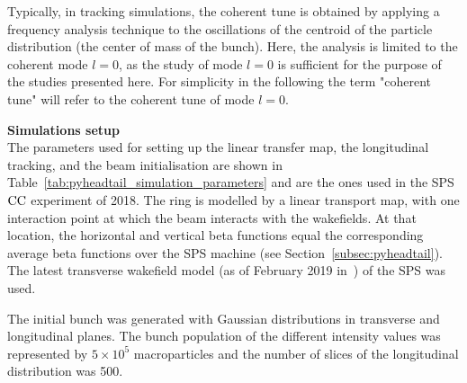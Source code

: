 Typically, in tracking simulations, the coherent tune is obtained by applying a frequency analysis technique to the oscillations of the centroid of the particle distribution (the center of mass of the bunch). Here, the analysis is limited to the coherent mode $l=0$, %
as the study of mode $l=0$ is sufficient for the purpose of the studies presented here. For simplicity in the following the term "coherent tune" will refer to the coherent tune of mode $l=0$.

\textbf{Simulations setup}\\
The parameters used for setting up the linear transfer map, the longitudinal tracking, and the beam initialisation are shown in Table~\ref{tab:pyheadtail_simulation_parameters} and are the ones used in the SPS ${\mathrm{CC}}$ experiment of 2018. The ring is modelled by a linear transport map, with one interaction point at which the beam interacts with the wakefields. At that location, the horizontal and vertical beta functions equal the corresponding average beta functions over the SPS machine (see Section~\ref{subsec:pyheadtail}). The latest transverse wakefield model (as of February 2019 in~\cite{sps_impedance_model_git}) of the SPS was used.

The initial bunch was generated with Gaussian distributions in transverse and longitudinal planes. The bunch population of the different intensity values was represented by $5 \times 10^5$ macroparticles and the number of slices of the longitudinal distribution was 500.

